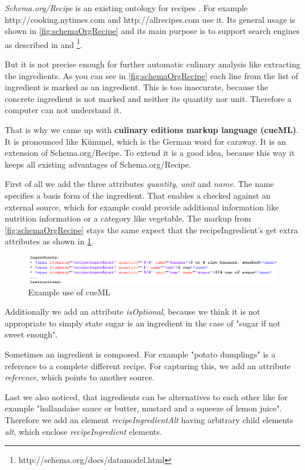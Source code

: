 \documentclass[12pt, twoside]{report}
\begin{document}
\textit{Schema.org/Recipe} is an existing ontology for recipes \parencite{schemaRecipe}. For example http://cooking.nytimes.com and http://allrecipes.com use it. Its general usage is shown in \cref{fig:schemaOrgRecipe} and its main purpose is to support search engines as described in \parencite{foodBlogger} and \footnote{http://schema.org/docs/datamodel.html}.

But it is not precise enough for further automatic culinary analysis like extracting the ingredients. As you can see in \cref{fig:schemaOrgRecipe} each line from the list of ingredient is marked as an ingredient. This is too inaccurate, because the concrete ingredient is not marked and neither its quantity nor unit. Therefore a computer can not understand it.

That is why we came up with \textbf{culinary editions markup language (cueML)}. It is pronounced like Kümmel, which is the German word for caraway. It is an extension of Schema.org/Recipe. To extend it is a good idea, because this way it keeps all existing advantages of Schema.org/Recipe.

First of all we add the three attributes \textit{quantity}, \textit{unit} and \textit{name}. The name specifies a basis form of the ingredient. That enables a checked against an external source, which for example could provide additional information like nutrition information or a category like vegetable. The markup from \cref{fig:schemaOrgRecipe} stays the same expect that the recipeIngredient's get extra attributes as shown in \cref{fig:exampleCueML}.

\begin{figure}[H]
	\centering
	\includegraphics[width=1\textwidth]{Images/exampleCueML}
	\caption{Example use of cueML}
	\label{fig:exampleCueML}
\end{figure} 

Additionally we add an attribute \textit{isOptional}, because we think it is not appropriate to simply state sugar is an ingredient in the case of "sugar if not sweet enough". 

Sometimes an ingredient is composed. For example "potato dumplings" is a reference to a complete different recipe. For capturing this, we add an attribute \textit{reference}, which points to another source.  

Last we also noticed, that ingredients can be alternatives to each other like for example "hollandaise sauce or butter, mustard and a squeeze of lemon juice". Therefore we add an element \textit{recipeIngredientAlt} having arbitrary child elements \textit{alt}, which enclose \textit{recipeIngredient} elements.
\end{document}
